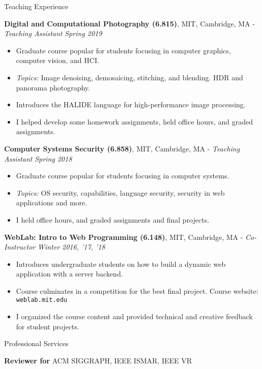 \documentclass{resume}
\begin{document}
\begin{area}{Teaching Experience}
    \item
        \textbf{Digital and Computational Photography (6.815)}, MIT, Cambridge, MA - \emph{Teaching Assistant} \hfill \emph{Spring 2019}
        \begin{itemize}
            \item Graduate course popular for students focusing in computer graphics, computer vision, and HCI.
            \item \emph{Topics:} Image denoising, demosaicing, stitching, and blending. HDR and panorama photography.
            \item Introduces the HALIDE language for high-performance image processing.
            \item I helped develop some homework assignments, held office hours, and graded assignments.
        \end{itemize}
    \item
        \textbf{Computer Systems Security (6.858)}, MIT, Cambridge, MA - \emph{Teaching Assistant} \hfill \emph{Spring 2018}
        \begin{itemize}
            \item Graduate course popular for students focusing in computer systems.
            \item \emph{Topics:} OS security, capabilities, language security, security in web applications and more.
            \item I held office hours, and graded assignments and final projects.
        \end{itemize}
    \item
        \textbf{WebLab: Intro to Web Programming (6.148)}, MIT, Cambridge, MA - \emph{Co-Instructor} \hfill \emph{Winter 2016, '17, '18}
        \begin{itemize}
            \item Introduces undergraduate students on how to build a dynamic web application with a server backend.
            \item Course culminates in a competition for the best final project. Course website: \texttt{weblab.mit.edu}
            \item I organized the course content and provided technical and creative feedback for student projects.
        \end{itemize}
\end{area}

\begin{area}{Professional Services}
    \item \textbf{Reviewer for} ACM SIGGRAPH, IEEE ISMAR, IEEE VR
\end{area}
\end{document}
